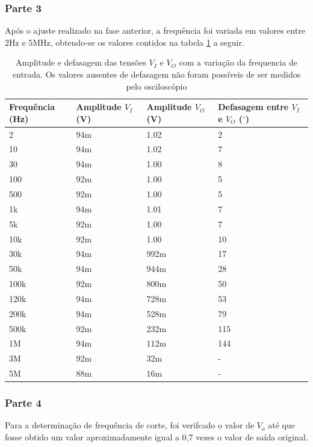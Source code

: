 \documentclass{abntex2}
\begin{document}
\subsubsection{Parte 3}

  Após o ajuste realizado na fase anterior, a frequência foi variada em valores entre 2Hz e 5MHz, obtendo-se os valores contidos na tabela \ref{tab:exp1} a seguir.

  \begin{table}[h!]
  \centering
  \begin{tabular}[width = 0.8\textwidth]{|l|l|l|l|}
    \hline
    Frequência (Hz) & Amplitude $V_I$ (V) & Amplitude $V_O$ (V) & Defasagem entre $V_I$ e $V_O$ ($^{\circ}$) \\
    \hline
    2  & 94m & 1.02 &  2 \\
    \hline
    10   & 94m & 1.02 &  7 \\
    \hline
    30   & 94m & 1.00 &  8 \\
    \hline
    100  & 92m & 1.00 &  5 \\
    \hline
    500  & 92m & 1.00 &  5 \\
    \hline
    1k   & 94m & 1.01 &  7 \\
    \hline
    5k   & 92m & 1.00 &  7 \\
    \hline
    10k  & 92m & 1.00 &  10 \\
    \hline
    30k  & 94m & 992m &  17 \\
    \hline
    50k  & 94m & 944m &  28 \\
    \hline
    100k & 92m & 800m &  50 \\
    \hline
    120k & 94m & 728m &  53 \\
    \hline
    200k & 94m & 528m &  79 \\
    \hline
    500k & 92m & 232m &  115 \\
    \hline
    1M   & 94m & 112m &  144 \\
    \hline
    3M   & 92m & 32m &   - \\
    \hline
    5M   & 88m & 16m &   - \\
    \hline
  \end{tabular}
  \caption{Amplitude e defasagem das tensões $V_I$ e $V_O$ com a variação da frequencia de entrada. Os valores ausentes de defasagem não foram possíveis de ser medidos pelo osciloscópio}
  \label{tab:exp1}
  \end{table}

\subsubsection{Parte 4}
  Para a determinação de frequência de corte, foi verifcado o valor de $V_o$ até que fosse obtido um valor aproximadamente igual a 0,7 vezes o valor de saída original.
\end{document}
